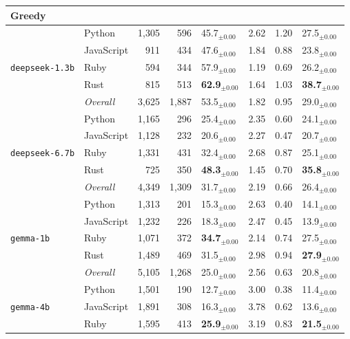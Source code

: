 \begin{longtable}{@{}llrrp{0.72cm}rrp{0.72cm}@{}}
  
  \multicolumn{8}{l}{\textbf{\small Greedy}} \\
  \midrule
      \multirow{5}{*}{\texttt{deepseek-1.3b}} & Python & 1,305 & 596 & 45.7$_{\pm 0.00}$ & 2.62 & 1.20 & 27.5$_{\pm 0.00}$ \\
       & JavaScript & 911 & 434 & 47.6$_{\pm 0.00}$ & 1.84 & 0.88 & 23.8$_{\pm 0.00}$ \\
       & Ruby & 594 & 344 & 57.9$_{\pm 0.00}$ & 1.19 & 0.69 & 26.2$_{\pm 0.00}$ \\
       & Rust & 815 & 513 & \textbf{62.9$_{\pm 0.00}$} & 1.64 & 1.03 & \textbf{38.7$_{\pm 0.00}$} \\ \cmidrule(lr){2-8}
      & \textit{Overall} & 3,625 & 1,887 & 53.5$_{\pm 0.00}$ & 1.82 & 0.95 & 29.0$_{\pm 0.00}$ \\
    \midrule
      \multirow{5}{*}{\texttt{deepseek-6.7b}} & Python & 1,165 & 296 & 25.4$_{\pm 0.00}$ & 2.35 & 0.60 & 24.1$_{\pm 0.00}$ \\
       & JavaScript & 1,128 & 232 & 20.6$_{\pm 0.00}$ & 2.27 & 0.47 & 20.7$_{\pm 0.00}$ \\
       & Ruby & 1,331 & 431 & 32.4$_{\pm 0.00}$ & 2.68 & 0.87 & 25.1$_{\pm 0.00}$ \\
       & Rust & 725 & 350 & \textbf{48.3$_{\pm 0.00}$} & 1.45 & 0.70 & \textbf{35.8$_{\pm 0.00}$} \\ \cmidrule(lr){2-8}
      & \textit{Overall} & 4,349 & 1,309 & 31.7$_{\pm 0.00}$ & 2.19 & 0.66 & 26.4$_{\pm 0.00}$ \\
    \midrule
      \multirow{5}{*}{\texttt{gemma-1b}} & Python & 1,313 & 201 & 15.3$_{\pm 0.00}$ & 2.63 & 0.40 & 14.1$_{\pm 0.00}$ \\
       & JavaScript & 1,232 & 226 & 18.3$_{\pm 0.00}$ & 2.47 & 0.45 & 13.9$_{\pm 0.00}$ \\
       & Ruby & 1,071 & 372 & \textbf{34.7$_{\pm 0.00}$} & 2.14 & 0.74 & 27.5$_{\pm 0.00}$ \\
       & Rust & 1,489 & 469 & 31.5$_{\pm 0.00}$ & 2.98 & 0.94 & \textbf{27.9$_{\pm 0.00}$} \\ \cmidrule(lr){2-8}
      & \textit{Overall} & 5,105 & 1,268 & 25.0$_{\pm 0.00}$ & 2.56 & 0.63 & 20.8$_{\pm 0.00}$ \\
    \midrule
      \multirow{5}{*}{\texttt{gemma-4b}} & Python & 1,501 & 190 & 12.7$_{\pm 0.00}$ & 3.00 & 0.38 & 11.4$_{\pm 0.00}$ \\
       & JavaScript & 1,891 & 308 & 16.3$_{\pm 0.00}$ & 3.78 & 0.62 & 13.6$_{\pm 0.00}$ \\
       & Ruby & 1,595 & 413 & \textbf{25.9$_{\pm 0.00}$} & 3.19 & 0.83 & \textbf{21.5$_{\pm 0.00}$} \\

\end{longtable}
